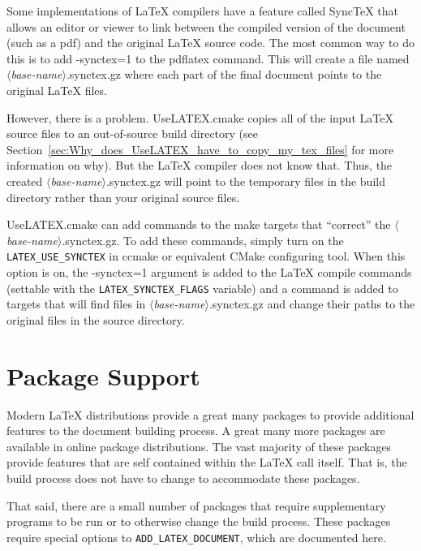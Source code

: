 \documentclass{article}
\newcommand*{\textfile}[1]{\textsf{#1}}
\newcommand*{\textprog}[1]{\textfile{#1}}
\newcommand*{\textcmake}[1]{\texttt{#1}}
\newcommand*{\textcmakevar}[1]{\textcmake{#1}}
\newcommand*{\UseLATEX}{\textfile{UseLATEX.cmake}\xspace}
\newcommand*{\latex}{\LaTeX\xspace}
\renewcommand*{\synctex}{SyncTeX\xspace}
\newcommand*{\synctex}{SyncTeX\xspace}
\newcommand*{\ald}{\textcmake{ADD\_LATEX\_DOCUMENT}\xspace}
\begin{document}
  Some implementations of \latex compilers have a feature called \synctex
  that allows an editor or viewer to link between the compiled version of
  the document (such as a pdf) and the original \latex source code.  The
  most common way to do this is to add \textprog{-synctex=1} to the
  \textprog{pdflatex} command.  This will create a file named
  \textfile{\emph{$\langle$base-name$\rangle$}.synctex.gz} where each part
  of the final document points to the original \latex files.

  However, there is a problem.  \UseLATEX copies all of the input \latex
  source files to an out-of-source build directory (see
  Section~\ref{sec:Why_does_UseLATEX_have_to_copy_my_tex_files} for more
  information on why).  But the \latex compiler does not know that.  Thus,
  the created \textfile{\emph{$\langle$base-name$\rangle$}.synctex.gz} will
  point to the temporary files in the build directory rather than your
  original source files.

  \UseLATEX can add commands to the make targets that ``correct'' the
  \textfile{\emph{$\langle$base-name$\rangle$}.synctex.gz}.  To add these
  commands, simply turn on the \textcmakevar{LATEX\_USE\_SYNCTEX} in
  \textprog{ccmake} or equivalent CMake configuring tool.  When this option
  is on, the \textprog{-synctex=1} argument is added to the \latex compile
  commands (settable with the \textcmakevar{LATEX\_SYNCTEX\_FLAGS}
  variable) and a command is added to targets that will find files in
  \textfile{\emph{$\langle$base-name$\rangle$}.synctex.gz} and change their
  paths to the original files in the source directory.


  \section{Package Support}
  \label{sec:PackageSupport}

  Modern \latex distributions provide a great many packages to provide
  additional features to the document building process.  A great many more
  packages are available in online package distributions.  The vast
  majority of these packages provide features that are self contained
  within the \latex call itself.  That is, the build process does not have
  to change to accommodate these packages.

  That said, there are a small number of packages that require
  supplementary programs to be run or to otherwise change the build
  process.  These packages require special options to \ald, which are
  documented here.
\end{document}
